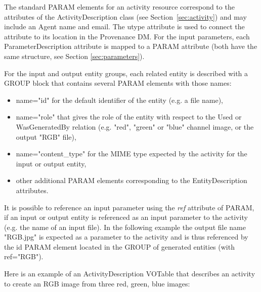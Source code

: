 The standard PARAM elements for an activity resource correspond to the attributes of the ActivityDescription class (see Section~\ref{sec:activity}) and may include an Agent name and email. The utype attribute is used to connect the attribute to its location in the Provenance DM.
For the input parameters, each ParameterDescription attribute is mapped to a PARAM attribute (both have the same structure, see Section \ref{sec:parameters}).

%
For the input and output entity groups, each related entity is described with a GROUP block that contains several PARAM elements with those names:
\begin{itemize}
 \item name="id" for the default identifier of the entity (e.g. a file name),
 \item name="role" that gives the role of the entity with respect to the Used or WasGeneratedBy relation (e.g. "red", "green" or "blue" channel image, or the output "RGB" file),
 \item name="content\_type" for the MIME type expected by the activity for the input or output entity,
 \item other additional PARAM elements corresponding to the EntityDescription attributes.
 \end{itemize} 
It is possible to reference an input parameter using the \emph{ref} attribute of PARAM, if an input or output entity is referenced as an input parameter to the activity (e.g. the name of an input file). In the following example the output file name "RGB.jpg" is expected as a parameter to the activity and is thus referenced by the id PARAM element located in the GROUP of generated entities (with ref="RGB").

Here is an example of an ActivityDescription VOTable that describes an activity to create an RGB image from three red, green, blue images:

